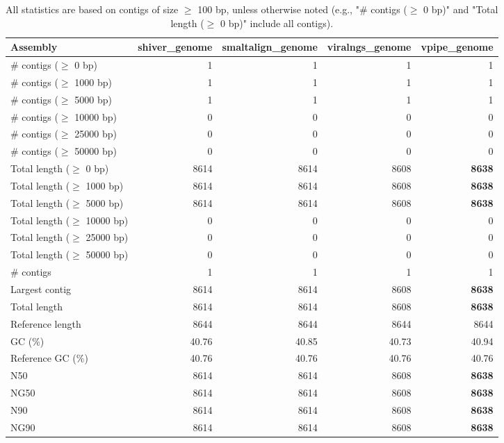 \documentclass[12pt,a4paper]{article}
\begin{document}
\begin{table}[ht]
\begin{center}
\caption{All statistics are based on contigs of size $\geq$ 100 bp, unless otherwise noted (e.g., "\# contigs ($\geq$ 0 bp)" and "Total length ($\geq$ 0 bp)" include all contigs).}
\begin{tabular}{|l*{4}{|r}|}
\hline
Assembly & shiver\_genome & smaltalign\_genome & viralngs\_genome & vpipe\_genome \\ \hline
\# contigs ($\geq$ 0 bp) & 1 & 1 & 1 & 1 \\ \hline
\# contigs ($\geq$ 1000 bp) & 1 & 1 & 1 & 1 \\ \hline
\# contigs ($\geq$ 5000 bp) & 1 & 1 & 1 & 1 \\ \hline
\# contigs ($\geq$ 10000 bp) & 0 & 0 & 0 & 0 \\ \hline
\# contigs ($\geq$ 25000 bp) & 0 & 0 & 0 & 0 \\ \hline
\# contigs ($\geq$ 50000 bp) & 0 & 0 & 0 & 0 \\ \hline
Total length ($\geq$ 0 bp) & 8614 & 8614 & 8608 & {\bf 8638} \\ \hline
Total length ($\geq$ 1000 bp) & 8614 & 8614 & 8608 & {\bf 8638} \\ \hline
Total length ($\geq$ 5000 bp) & 8614 & 8614 & 8608 & {\bf 8638} \\ \hline
Total length ($\geq$ 10000 bp) & 0 & 0 & 0 & 0 \\ \hline
Total length ($\geq$ 25000 bp) & 0 & 0 & 0 & 0 \\ \hline
Total length ($\geq$ 50000 bp) & 0 & 0 & 0 & 0 \\ \hline
\# contigs & 1 & 1 & 1 & 1 \\ \hline
Largest contig & 8614 & 8614 & 8608 & {\bf 8638} \\ \hline
Total length & 8614 & 8614 & 8608 & {\bf 8638} \\ \hline
Reference length & 8644 & 8644 & 8644 & 8644 \\ \hline
GC (\%) & 40.76 & 40.85 & 40.73 & 40.94 \\ \hline
Reference GC (\%) & 40.76 & 40.76 & 40.76 & 40.76 \\ \hline
N50 & 8614 & 8614 & 8608 & {\bf 8638} \\ \hline
NG50 & 8614 & 8614 & 8608 & {\bf 8638} \\ \hline
N90 & 8614 & 8614 & 8608 & {\bf 8638} \\ \hline
NG90 & 8614 & 8614 & 8608 & {\bf 8638} \\ \hline

\end{tabular}
\end{center}
\end{table}
\end{document}
